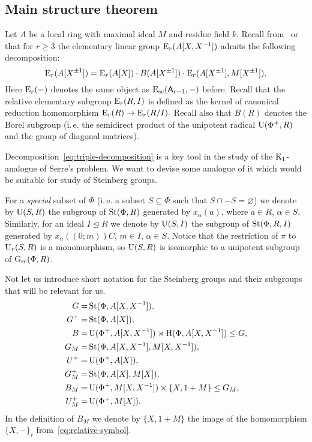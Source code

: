 \subsection{Main structure theorem} \label{subsec:structure-theorem-overview}
Let $A$ be a local ring with maximal ideal $M$ and residue field $k$.
Recall from~\cite[\S~4]{Su77} or~\cite[\S~VI.6]{Lam10} that for $r \geq 3$ the elementary linear group $\operatorname{E}_r(A[X, X^{-1}])$ admits the following decomposition:
\begin{equation}\label{eq:triple-decomposition}
\operatorname{E}_r(A[X^{\pm 1}]) = \operatorname{E}_r(A[X]) \cdot B(A[X^{\pm 1}]) \cdot \operatorname{E}_r(A[X^{\pm 1}], M[X^{\pm 1}]).
\end{equation}
Here $\operatorname{E}_r(-)$ denotes the same object as $\operatorname{E}_\mathrm{sc}(\mathsf{A}_{r - 1}, -)$ before.
Recall that the relative elementary subgroup $\operatorname{E}_r(R, I)$ is defined as the kernel of canonical reduction homomorphism $\operatorname{E}_r(R) \to \operatorname{E}_r(R/I).$
Recall also that $B(R)$ denotes the Borel subgroup (i.\,e. the semidirect product of the unipotent radical $\operatorname{U}(\Phi^+, R)$ and the group of diagonal matrices).

Decomposition~\eqref{eq:triple-decomposition} is a key tool in the study of the {$\operatorname{K}_1$-analogue of Serre's problem}.
We want to devise some analogue of it which would be suitable for study of Steinberg groups.

For a \textit{special} subset of $\Phi$ (i.\,e. a subset $S \subseteq \Phi$ such that $S \cap -S = \varnothing$)
we denote by $\operatorname{U}(S, R)$ the subgroup of $\operatorname{St}(\Phi, R)$ generated by $x_\alpha(a)$, where $a \in R$, $\alpha \in S$.
Similarly, for an ideal $I \trianglelefteq R$ we denote by $\operatorname{U}(S, I)$ the subgroup of $\operatorname{St}(\Phi, R, I)$ generated by $x_\alpha((0;m))C$, $m \in I$, $\alpha \in S$.
Notice that the restriction of $\pi$ to $\operatorname{U}_r(S, R)$ is a monomorphism, so $\operatorname{U}(S, R)$ is isomorphic to a unipotent subgroup of $\operatorname{G}_\mathrm{sc}(\Phi, R)$.

Not let us introduce short notation for the Steinberg groups and their subgroups that will be relevant for us.
\begin{align*}
    G     =& \operatorname{St}(\Phi, A[X, X^{-1}]),\\
    G^+   =& \operatorname{St}(\Phi, A[X]),\\
    B     =& \operatorname{U}(\Phi^+, A[X, X^{-1}]) \rtimes \operatorname{H}(\Phi, A[X, X^{-1}]) \leq G,\\
    G_M   =& \operatorname{St}(\Phi, A[X, X^{-1}], M[X, X^{-1}]),\\
    U^+   =& \operatorname{U}(\Phi^+, A[X]),\\
    G^+_M =& \operatorname{St}(\Phi, A[X], M[X]),\\
    B_M   =& \operatorname{U}(\Phi^+, M[X, X^{-1}]) \times \{X, 1+M\} \leq G_M,\\
    U^+_M =& \operatorname{U}(\Phi^+, M[X]).
\end{align*}
In the definition of $B_M$ we denote by $\{X, 1+M\}$ the image of the homomorphism $\{X, -\}_{r}$ from~\eqref{eq:relative-symbol}.

